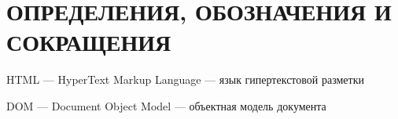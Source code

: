 \section*{ОПРЕДЕЛЕНИЯ, ОБОЗНАЧЕНИЯ И СОКРАЩЕНИЯ}

HTML --- HyperText Markup Language --- язык гипертекстовой разметки

DOM --- Document Object Model --- объектная модель документа



\pagebreak